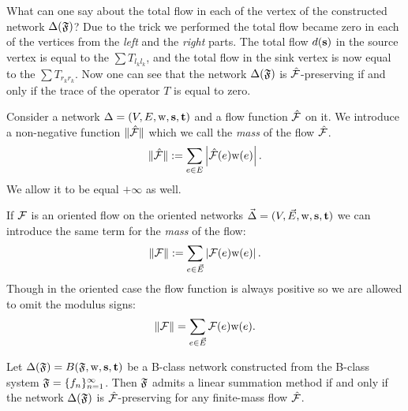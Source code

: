 \documentclass[12pt]{article}
\begin{document}
    What can one say about the total flow in each of the vertex of the constructed network $\Delta(\mathfrak{F})$?
    Due to the trick we performed the total flow became zero in each of the vertices from the \emph{left} and the \emph{right} parts.
    The total flow $d(\mathbf{s})$ in the source vertex is equal to the $\sum T_{l_k l_k}$, and the total flow in the
      sink vertex is now equal to the $\sum T_{r_k r_k}$.
    Now one can see that the network $\Delta(\mathfrak{F})$ is $\mathcal{\hat{F}}$-preserving if and only if the trace of the operator $T$ is equal to
      zero.
    \begin{definition}
      Consider a network $\Delta = (V, E, \mathrm{w}, \mathbf{s}, \mathbf{t})$ and a flow function $\mathcal{\hat{F}}$ on it.
      We introduce a non-negative function $\|\mathcal{\hat{F}}\|$ which we call the \emph{mass} of the flow $\mathcal{\hat{F}}$.
      \[
        \|\mathcal{\hat{F}}\| := \sum_{e \in E} \left|\mathcal{\hat{F}}(e) \mathrm{w}(e)\right|.
      \]
      We allow it to be equal $+\infty$ as well.
    \end{definition}
    \begin{definition}
      If $\mathcal{F}$ is an oriented flow on the oriented networks $\vec{\Delta} = (V,\vec{E},\mathrm{w}, \mathbf{s}, \mathbf{t})$ 
        we can introduce the same term for the \emph{mass} of the flow:
      \[
        \|\mathcal{F}\| := \sum_{e \in \vec{E}} \left|\mathcal{F}(e) \mathrm{w}(e)\right|.
      \]
      Though in the oriented case the flow function is always positive
        so we are allowed to omit the modulus signs:
      \[
        \|\mathcal{F}\| = \sum_{e \in \vec{E}} \mathcal{F}(e) \mathrm{w}(e).
      \]
    \end{definition}
    \begin{theorem}
      \label{thm-graph-eq}
        Let $\Delta(\mathfrak{F}) = B(\mathfrak{F}, \mathrm{w}, \mathbf{s}, \mathbf{t})$ be a B-class network constructed
          from the B-class system $\mathfrak{F} = \{{f}_n\}_{n=1}^\infty$.
        Then $\mathfrak{F}$ admits a linear summation method if and only if
          the network $\Delta(\mathfrak{F})$ is $\mathcal{\hat{F}}$-preserving for any
          finite-mass flow $\mathcal{\hat{F}}$.
    \end{theorem}
\end{document}
